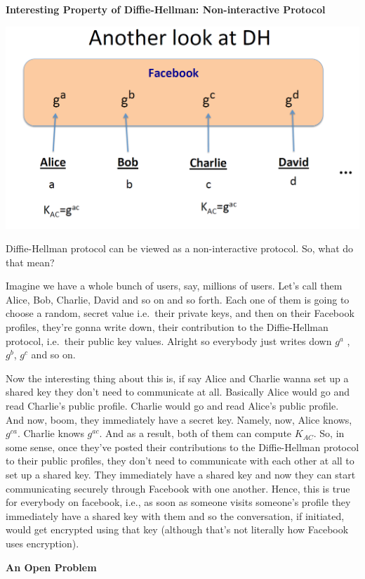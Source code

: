 \documentclass[11pt]{article}
\makeatletter
\def\maxwidth{\ifdim\Gin@nat@width>\linewidth\linewidth
    \else\Gin@nat@width\fi}
\let\Oldincludegraphics\includegraphics
\renewcommand{\includegraphics}[1]{\Oldincludegraphics[width=.8\maxwidth]{#1}}
\makeatother
\begin{document}
\textbf{Interesting Property of Diffie-Hellman: Non-interactive
Protocol}

\includegraphics{./Images/DH-NonInteractive.png}

Diffie-Hellman protocol can be viewed as a non-interactive protocol. So,
what do that mean?

Imagine we have a whole bunch of users, say, millions of users. Let's
call them Alice, Bob, Charlie, David and so on and so forth. Each one of
them is going to choose a random, secret value i.e.~their private keys,
and then on their Facebook profiles, they're gonna write down, their
contribution to the Diffie-Hellman protocol, i.e.~their public key
values. Alright so everybody just writes down \(g^{a}\) , \(g^{b}\),
\(g^{c}\) and so on.

Now the interesting thing about this is, if say Alice and Charlie wanna
set up a shared key they don't need to communicate at all. Basically
Alice would go and read Charlie's public profile. Charlie would go and
read Alice's public profile. And now, boom, they immediately have a
secret key. Namely, now, Alice knows, \(g^{ca}\). Charlie knows
\(g^{ac}\). And as a result, both of them can compute \(K_{AC}\). So, in
some sense, once they've posted their contributions to the
Diffie-Hellman protocol to their public profiles, they don't need to
communicate with each other at all to set up a shared key. They
immediately have a shared key and now they can start communicating
securely through Facebook with one another. Hence, this is true for
everybody on facebook, i.e., as soon as someone visits someone's profile
they immediately have a shared key with them and so the conversation, if
initiated, would get encrypted using that key (although that's not
literally how Facebook uses encryption).

\textbf{An Open Problem}
\end{document}
